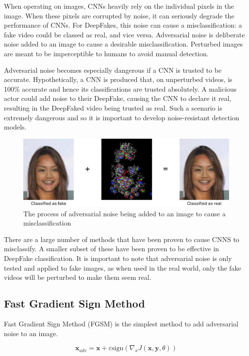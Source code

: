 When operating on images, CNNs heavily rely on the individual pixels in the image. When these pixels are corrupted by noise, it can seriously degrade the performance of CNNs\cite{yim2017enhancing}. For DeepFakes, this noise can cause a misclassification: a fake video could be classed as real, and vice versa. Adversarial noise is deliberate noise added to an image to cause a desirable misclassification. Perturbed images are meant to be imperceptible to humans to avoid manual detection.

Adversarial noise becomes especially dangerous if a CNN is trusted to be accurate. Hypothetically, a CNN is produced that, on unperturbed videos, is 100\% accurate and hence its classifications are trusted absolutely. A malicious actor could add noise to their DeepFake, causing the CNN to declare it real, resulting in the DeepFaked video being trusted as real. Such a scenario is extremely dangerous and so it is important to develop noise-resistant detection models.

\begin{figure}[H]
    \centering
    \includegraphics[width=0.75\linewidth]{dissertation//figures/noise.png}
    \caption{The process of adversarial noise being added to an image to cause a misclassification}
    \label{fig:noise}
\end{figure}

There are a large number of methods that have been proven to cause CNNS to misclassify. A smaller subset of these have been proven to be effective in DeepFake classification. It is important to note that adversarial noise is only tested and applied to fake images, as when used in the real world, only the fake videos will be perturbed to make them seem real.

\subsection{Fast Gradient Sign Method}
\label{sec:fgsm}

Fast Gradient Sign Method (FGSM)\cite{goodfellow2014explaining} is the simplest method to add adversarial noise to an image.

\begin{equation}
    \label{eq:fgsm}
    \mathbf{x}_{adv} = \mathbf{x} + \varepsilon \text{sign}(\nabla_x J(\mathbf{x},\mathbf{y}, \theta))
\end{equation}

